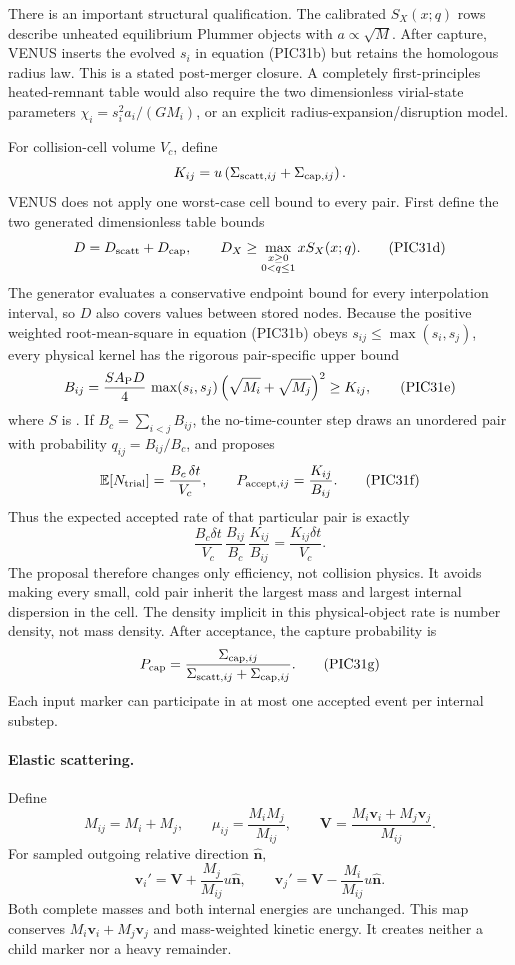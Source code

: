 There is an important structural qualification.  The calibrated
\(S_X(x;q)\) rows describe unheated equilibrium Plummer objects with
\(a\propto\sqrt M\).  After capture, VENUS inserts the evolved \(s_i\) in
equation (PIC31b) but retains the homologous radius law.  This is a stated
post-merger closure.  A completely first-principles heated-remnant table would
also require the two dimensionless virial-state parameters
\(\chi_i=s_i^2a_i/(GM_i)\), or an explicit radius-expansion/disruption model.

For collision-cell volume \(V_c\), define
\[
 K_{ij}=u\left(\Sigma_{{\rm scatt},ij}
                    +\Sigma_{{\rm cap},ij}\right).
\]
VENUS does not apply one worst-case cell bound to every pair.  First define
the two generated dimensionless table bounds
\[
 D=D_{\rm scatt}+D_{\rm cap},\qquad
 D_X\ge\max_{\substack{x\ge0\\0<q\le1}}xS_X(x;q).         \tag{PIC31d}
\]
The generator evaluates a conservative endpoint bound for every interpolation
interval, so \(D\) also covers values between stored nodes.
Because the positive weighted root-mean-square in equation (PIC31b) obeys
\(s_{ij}\le\max(s_i,s_j)\), every physical kernel has the rigorous
pair-specific upper bound
\[
 B_{ij}=
 \frac{S A_{\rm P}D}{4}\,
 \max(s_i,s_j)
 \left(\sqrt{M_i}+\sqrt{M_j}\right)^2
 \ge K_{ij},                                               \tag{PIC31e}
\]
where \(S\) is .  If
\(B_c=\sum_{i<j}B_{ij}\), the no-time-counter step draws an unordered pair
with probability \(q_{ij}=B_{ij}/B_c\), and proposes
\[
 \mathbb E[N_{\rm trial}]=\frac{B_c\,\delta t}{V_c},
 \qquad
 P_{{\rm accept},ij}=\frac{K_{ij}}{B_{ij}}.                \tag{PIC31f}
\]
Thus the expected accepted rate of that particular pair is exactly
\[
 \frac{B_c\delta t}{V_c}\,
 \frac{B_{ij}}{B_c}\,\frac{K_{ij}}{B_{ij}}
 =\frac{K_{ij}\delta t}{V_c}.
\]
The proposal therefore changes only efficiency, not collision physics.
It avoids making every small, cold pair inherit the largest mass and largest
internal dispersion in the cell.  The density implicit in this
physical-object rate is number density, not mass density.  After acceptance,
the capture probability is
\[
 P_{\rm cap}
 =\frac{\Sigma_{{\rm cap},ij}}
 {\Sigma_{{\rm scatt},ij}+\Sigma_{{\rm cap},ij}}.         \tag{PIC31g}
\]
Each input marker can participate in at most one accepted event per internal
substep.

\paragraph{Elastic scattering.}
Define
\[
 M_{ij}=M_i+M_j,\qquad
 \mu_{ij}=\frac{M_iM_j}{M_{ij}},\qquad
 \bm V=\frac{M_i\bm v_i+M_j\bm v_j}{M_{ij}}.              \tag{PIC32P}
\]
For sampled outgoing relative direction \(\widehat{\bm n}\),
\[
 \bm v_i'=\bm V+\frac{M_j}{M_{ij}}u\widehat{\bm n},
 \qquad
 \bm v_j'=\bm V-\frac{M_i}{M_{ij}}u\widehat{\bm n}.       \tag{PIC33P}
\]
Both complete masses and both internal energies are unchanged.  This map
conserves \(M_i\bm v_i+M_j\bm v_j\) and mass-weighted kinetic energy.  It
creates neither a child marker nor a heavy remainder.

